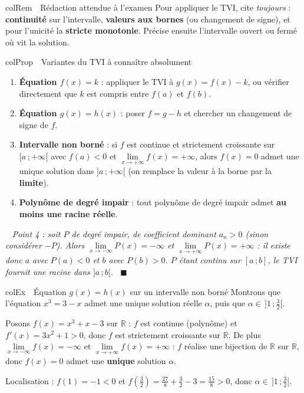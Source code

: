 \documentclass[11pt,a4paper]{article}
\newenvironment{propriete}[1][Propriété]
  {\begin{fiche}{colProp}{\ding{72}~~#1}}{\end{fiche}}
\newenvironment{exemple}[1][Exemple]
  {\begin{fiche}{colEx}{\ding{217}~~#1}}{\end{fiche}}
\newenvironment{remarque}[1][Remarque]
  {\begin{fiche}{colRem}{\ding{43}~~#1}}{\end{fiche}}
\newenvironment{demo}
  {\par\smallskip\noindent{\sffamily\bfseries\color{qtealdark}Démonstration.}\ \itshape}
  {\ \normalfont\hfill$\blacksquare$\par\medskip}
\begin{document}
\begin{remarque}[Rédaction attendue à l'examen]
Pour appliquer le TVI, cite \emph{toujours} : \textbf{continuité} sur l'intervalle, \textbf{valeurs aux bornes} (ou changement de signe), et pour l'unicité la \textbf{stricte monotonie}. Précise ensuite l'intervalle ouvert ou fermé où vit la solution.
\end{remarque}

\begin{propriete}[Variantes du TVI à connaître absolument]
\begin{enumerate}[leftmargin=7mm, itemsep=0.5mm]
  \item \textbf{Équation $f(x) = k$} : appliquer le TVI à $g(x) = f(x) - k$, ou vérifier directement que $k$ est compris entre $f(a)$ et $f(b)$.
  \item \textbf{Équation $g(x) = h(x)$} : poser $f = g - h$ et chercher un changement de signe de $f$.
  \item \textbf{Intervalle non borné} : si $f$ est continue et strictement croissante sur $[a\,;+\infty[$ avec $f(a) < 0$ et $\lim\limits_{x \to +\infty} f(x) = +\infty$, alors $f(x) = 0$ admet une unique solution dans $]a\,;+\infty[$ (on remplace la valeur à la borne par la \textbf{limite}).
  \item \textbf{Polynôme de degré impair} : tout polynôme de degré impair admet \textbf{au moins une racine réelle}.
\end{enumerate}
\end{propriete}

\begin{demo}
Point 4 : soit $P$ de degré impair, de coefficient dominant $a_n > 0$ (sinon considérer $-P$). Alors $\lim\limits_{x \to -\infty} P(x) = -\infty$ et $\lim\limits_{x \to +\infty} P(x) = +\infty$ : il existe donc $a$ avec $P(a) < 0$ et $b$ avec $P(b) > 0$. $P$ étant continu sur $[a\,;b]$, le TVI fournit une racine dans $]a\,;b[$.
\end{demo}

\begin{exemple}[Équation $g(x) = h(x)$ sur un intervalle non borné]
Montrons que l'équation $x^3 = 3 - x$ admet une unique solution réelle $\alpha$, puis que $\alpha \in\, ]1\,;\frac{3}{2}[$.

\smallskip
Posons $f(x) = x^3 + x - 3$ sur $\mathbb{R}$ : $f$ est continue (polynôme) et $f'(x) = 3x^2 + 1 > 0$, donc $f$ est strictement croissante sur $\mathbb{R}$. De plus $\lim\limits_{x \to -\infty} f(x) = -\infty$ et $\lim\limits_{x \to +\infty} f(x) = +\infty$ : $f$ réalise une bijection de $\mathbb{R}$ sur $\mathbb{R}$, donc $f(x) = 0$ admet une \textbf{unique} solution $\alpha$.

\smallskip
Localisation : $f(1) = -1 < 0$ et $f\!\left(\frac{3}{2}\right) = \frac{27}{8} + \frac{3}{2} - 3 = \frac{15}{8} > 0$, donc $\alpha \in\, \bigl]1\,;\frac{3}{2}\bigr[$.
\end{exemple}
\end{document}
